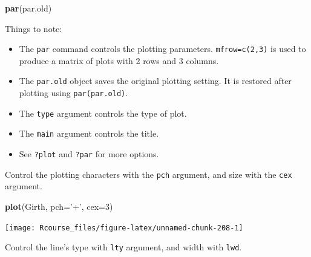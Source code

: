 \documentclass[]{book}
\newenvironment{Shaded}{\begin{snugshade}}{\end{snugshade}}
\newcommand{\KeywordTok}[1]{\textcolor[rgb]{0.13,0.29,0.53}{\textbf{#1}}}
\newcommand{\DataTypeTok}[1]{\textcolor[rgb]{0.13,0.29,0.53}{#1}}
\newcommand{\DecValTok}[1]{\textcolor[rgb]{0.00,0.00,0.81}{#1}}
\newcommand{\StringTok}[1]{\textcolor[rgb]{0.31,0.60,0.02}{#1}}
\newcommand{\NormalTok}[1]{#1}
\providecommand{\tightlist}{%
  \setlength{\itemsep}{0pt}\setlength{\parskip}{0pt}}
\theoremstyle{definition}
\theoremstyle{definition}
\theoremstyle{definition}
\theoremstyle{remark}
\begin{document}
\begin{Shaded}
\begin{Highlighting}[]
\KeywordTok{par}\NormalTok{(par.old)}
\end{Highlighting}
\end{Shaded}

Things to note:

\begin{itemize}
\tightlist
\item
  The \texttt{par} command controls the plotting parameters.
  \texttt{mfrow=c(2,3)} is used to produce a matrix of plots with 2 rows
  and 3 columns.
\item
  The \texttt{par.old} object saves the original plotting setting. It is
  restored after plotting using \texttt{par(par.old)}.
\item
  The \texttt{type} argument controls the type of plot.
\item
  The \texttt{main} argument controls the title.
\item
  See \texttt{?plot} and \texttt{?par} for more options.
\end{itemize}

Control the plotting characters with the \texttt{pch} argument, and size
with the \texttt{cex} argument.

\begin{Shaded}
\begin{Highlighting}[]
\KeywordTok{plot}\NormalTok{(Girth, }\DataTypeTok{pch=}\StringTok{'+'}\NormalTok{, }\DataTypeTok{cex=}\DecValTok{3}\NormalTok{)}
\end{Highlighting}
\end{Shaded}

\texttt{[image: Rcourse\_files/figure-latex/unnamed-chunk-208-1]}

Control the line's type with \texttt{lty} argument, and width with
\texttt{lwd}.
\end{document}
